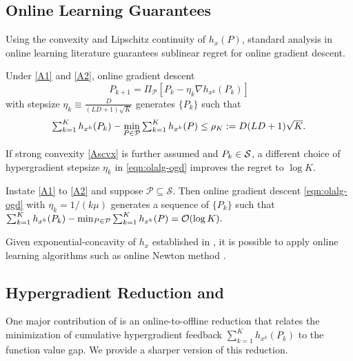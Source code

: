 \subsection{Online Learning Guarantees}

Using the convexity and Lipschitz continuity of $h_x(P)$, standard analysis in online learning literature  \cite{orabona2019modern,hazan2016introduction} guarantees sublinear regret for online gradient descent. 

\begin{lem} \label{lem:regret-sublinear}
  Under \ref{A1} and \ref{A2}, online gradient descent
\begin{equation} \label{eqn:olalg-ogd}
	P_{k + 1} = \Pi_{\mathcal{P}} [P_k - \eta_k \nabla h_{x^k} (P_k)]
\end{equation}
with stepsize $\eta_k \equiv \tfrac{D}{ (L D + 1) \sqrt{K}}$ generates 
  $\{P_k\}$ such that
\begin{align}
\textstyle \sum_{k = 1}^K h_{x^k} (P_k) - \displaystyle \min_{P \in \mathcal{P}}  \textstyle \sum_{k = 1}^K h_{x^k} (P)
\leq \rho_{K} := D (L D + 1) \sqrt{K} \label{eqn:ogd-constant}. 
\end{align}
\end{lem}

If strong convexity \ref{Ascvx} is further assumed and $P_k \in \mathcal{S}$, a different choice of hypergradient stepsize $\eta_k$ in \eqref{eqn:olalg-ogd} improves the regret to $\log K$.

\begin{lem} \label{lem:regret-log}
Instate \ref{A1} to \ref{A2} and suppose $\mathcal{P} \subseteq
  \mathcal{S}$. Then online gradient descent \eqref{eqn:olalg-ogd}	with  $\eta_k = 1/(k \mu)$ generates a sequence of $\{
  P_k \}$ such that $\textstyle \sum_{k = 1}^K h_{x^k} (P_k) -  \min_{P \in \mathcal{P}}  \textstyle \sum_{k
  = 1}^K h_{x^k} (P) = \mathcal{O}(\log K). $
\end{lem}

\begin{rem}
Given exponential-concavity of $h_x$ established in , it is possible to apply online learning algorithms such as online Newton method \cite{hazan2007logarithmic}.
\end{rem}

\subsection{Hypergradient Reduction and {\hdm}}
One major contribution of \cite{gao2024gradient} is an online-to-offline reduction that relates the minimization of cumulative hypergradient feedback $\textstyle \sum_{k=1}^K h_{x^k}(P_k)$ to the function value gap.
We provide a sharper version of this reduction.

